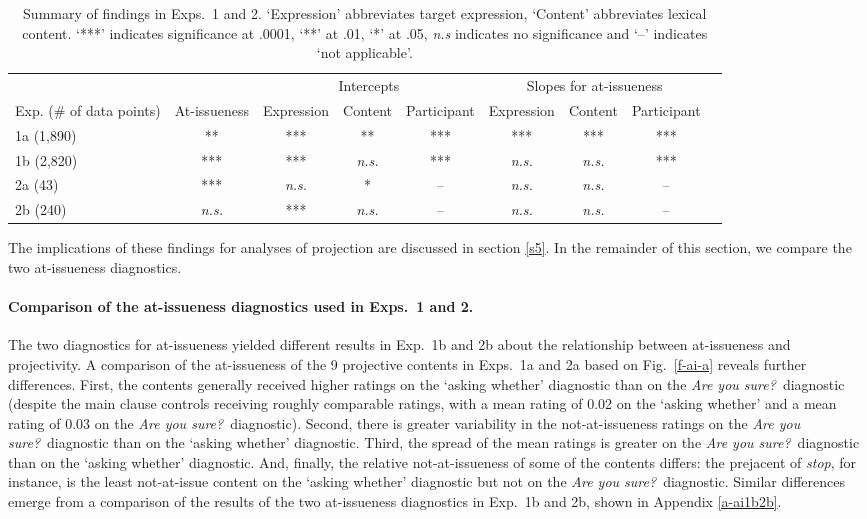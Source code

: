 \documentclass[11pt,fleqn]{article}
\newcommand{\6}{\mbox{$[\hspace*{-.6mm}[$}}
\newcommand{\9}{\mbox{$]\hspace*{-.6mm}]$}}
\newcommand{\figref}[1]{Fig.~\ref{#1}}
\begin{document}
\begin{table}[h!]

\begin{center}
\begin{tabular}{p{1.8cm} | c | c c c | c c c c}
\toprule
& & \multicolumn{3}{c|}{Intercepts} & \multicolumn{3}{c}{Slopes for at-issueness}\\
Exp. (\# of data points) & At-issueness & Expression & Content & Participant & Expression & Content & Participant\\
\midrule
1a (1,890) & ** & *** & ** & *** & *** & *** & ***  \\ 

1b (2,820) & *** & *** & \emph{n.s.} &  *** & \emph{n.s.} & \emph{n.s.} & *** \\ 

2a (43) & *** & \emph{n.s.} & * & -- & \emph{n.s.} & \emph{n.s.} & -- \\ 

2b (240) & \emph{n.s.} & *** & \emph{n.s.} & --& \emph{n.s.} & \emph{n.s.} & -- \\ 
\bottomrule
\end{tabular}
\end{center}
\caption{Summary of findings in Exps.~1 and 2. `Expression' abbreviates target expression, `Content' abbreviates lexical content. `***' indicates significance at .0001, `**' at .01, `*' at .05, \emph{n.s} indicates no significance and `--' indicates `not applicable'.}\label{t-summary}
\end{table}

The implications of these findings for analyses of projection are discussed in section \ref{s5}. In the remainder of this section, we compare the two at-issueness diagnostics. 

\paragraph{Comparison of the at-issueness diagnostics used in Exps.~1 and 2.} The two diagnostics for at-issueness yielded different results in Exp.~1b and 2b about the relationship between at-issueness and projectivity. A comparison of the at-issueness of the 9 projective contents in Exps.~1a and 2a based on \figref{f-ai-a} reveals further differences. First, the contents generally received higher ratings on the `asking whether' diagnostic than on the {\em Are you sure?}~diagnostic (despite the main clause controls receiving roughly comparable ratings, with a mean rating of 0.02 on the `asking whether' and a mean rating of 0.03 on the {\em Are you sure?}~diagnostic). Second, there is greater variability in the not-at-issueness ratings on the {\em Are you sure?}~diagnostic  than on the `asking whether' diagnostic. Third, the spread of the mean ratings is greater on the {\em Are you sure?}~diagnostic than on the `asking whether' diagnostic. And, finally, the relative not-at-issueness of some of the contents differs: the prejacent of {\em stop}, for instance, is the least not-at-issue content on the `asking whether' diagnostic but not on the {\em Are you sure?}~diagnostic. Similar differences emerge from a comparison of the results of the two at-issueness diagnostics in Exp.~1b and 2b, shown in Appendix \ref{a-ai1b2b}. 
\end{document}

